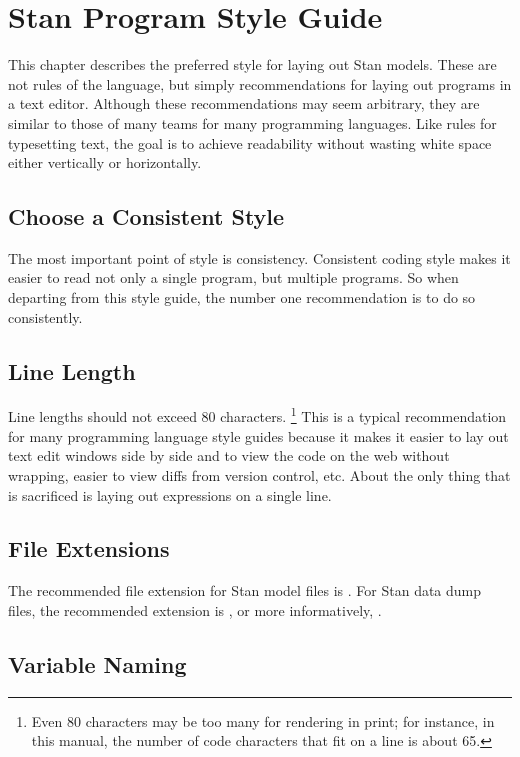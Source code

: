 \chapter{Stan Program Style Guide}

\noindent
This chapter describes the preferred style for laying out Stan
models. These are not rules of the language, but simply
recommendations for laying out programs in a text editor.  Although
these recommendations may seem arbitrary, they are similar to those of
many teams for many programming languages.  Like rules for typesetting
text, the goal is to achieve readability without wasting white space
either vertically or horizontally.

\section{Choose a Consistent Style}

The most important point of style is consistency.  Consistent coding
style makes it easier to read not only a single program, but multiple
programs.  So when departing from this style guide, the number one
recommendation is to do so consistently.

\section{Line Length}

Line lengths should not exceed 80 characters.%
%
\footnote{Even 80 characters may be too many for rendering in print;
  for instance, in this manual, the number of code characters that fit
  on a line is about 65.}
%
This is a typical recommendation for many programming language style
guides because it makes it easier to lay out text edit windows side by
side and to view the code on the web without wrapping, easier to view
diffs from version control, etc.  About the only thing that is
sacrificed is laying out expressions on a single line.

\section{File Extensions}

The recommended file extension for Stan model files is .  
For Stan data dump files, the recommended extension is , or
more informatively, .

\section{Variable Naming}

